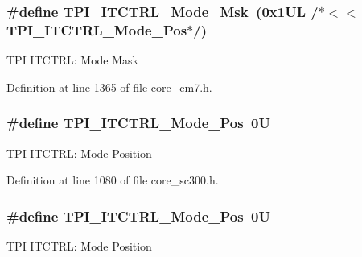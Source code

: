 \subsubsection[{\texorpdfstring{T\+P\+I\+\_\+\+I\+T\+C\+T\+R\+L\+\_\+\+Mode\+\_\+\+Msk}{TPI_ITCTRL_Mode_Msk}}]{\setlength{\rightskip}{0pt plus 5cm}\#define T\+P\+I\+\_\+\+I\+T\+C\+T\+R\+L\+\_\+\+Mode\+\_\+\+Msk~(0x1\+U\+L /$\ast$$<$$<$ T\+P\+I\+\_\+\+I\+T\+C\+T\+R\+L\+\_\+\+Mode\+\_\+\+Pos$\ast$/)}\hypertarget{group___c_m_s_i_s___t_p_i_gad6f87550b468ad0920d5f405bfd3f017}{}\label{group___c_m_s_i_s___t_p_i_gad6f87550b468ad0920d5f405bfd3f017}
T\+PI I\+T\+C\+T\+RL\+: Mode Mask 

Definition at line 1365 of file core\+\_\+cm7.\+h.

\subsubsection[{\texorpdfstring{T\+P\+I\+\_\+\+I\+T\+C\+T\+R\+L\+\_\+\+Mode\+\_\+\+Pos}{TPI_ITCTRL_Mode_Pos}}]{\setlength{\rightskip}{0pt plus 5cm}\#define T\+P\+I\+\_\+\+I\+T\+C\+T\+R\+L\+\_\+\+Mode\+\_\+\+Pos~0U}\hypertarget{group___c_m_s_i_s___t_p_i_gaa847adb71a1bc811d2e3190528f495f0}{}\label{group___c_m_s_i_s___t_p_i_gaa847adb71a1bc811d2e3190528f495f0}
T\+PI I\+T\+C\+T\+RL\+: Mode Position 

Definition at line 1080 of file core\+\_\+sc300.\+h.

\subsubsection[{\texorpdfstring{T\+P\+I\+\_\+\+I\+T\+C\+T\+R\+L\+\_\+\+Mode\+\_\+\+Pos}{TPI_ITCTRL_Mode_Pos}}]{\setlength{\rightskip}{0pt plus 5cm}\#define T\+P\+I\+\_\+\+I\+T\+C\+T\+R\+L\+\_\+\+Mode\+\_\+\+Pos~0U}\hypertarget{group___c_m_s_i_s___t_p_i_gaa847adb71a1bc811d2e3190528f495f0}{}\label{group___c_m_s_i_s___t_p_i_gaa847adb71a1bc811d2e3190528f495f0}
T\+PI I\+T\+C\+T\+RL\+: Mode Position 


